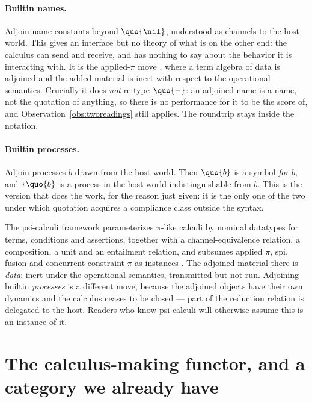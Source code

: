 \paragraph{Builtin names.}
Adjoin name constants beyond $\quo{\nil}$, understood as channels
to the host world.
This gives an interface but no theory of what is on the other end:
the calculus can send and receive, and has nothing to say about the
behavior it is interacting with.
It is the applied-$\pi$ move \cite{abadi2001}, where a term algebra
of data is adjoined and the added material is inert with respect to
the operational semantics.
Crucially it does \emph{not} re-type $\quo{-}$: an adjoined name is
a name, not the quotation of anything, so there is no performance
for it to be the score of, and Observation~\ref{obs:tworeadings}
still applies.
The roundtrip stays inside the notation.

\paragraph{Builtin processes.}
Adjoin processes $b$ drawn from the host world.
Then $\quo{b}$ is a symbol \emph{for} $b$, and $*\quo{b}$ is a
process in the host world indistinguishable from $b$.
This is the version that does the work, for the reason just given:
it is the only one of the two under which quotation acquires a
compliance class outside the syntax.

\begin{remark}
\label{rem:psi}
The psi-calculi framework parameterizes $\pi$-like calculi by
nominal datatypes for terms, conditions and assertions, together
with a channel-equivalence relation, a composition, a unit and an
entailment relation, and subsumes applied $\pi$, spi, fusion and
concurrent constraint $\pi$ as instances \cite{bengtson2011}.
The adjoined material there is \emph{data}: inert under the
operational semantics, transmitted but not run.
Adjoining builtin \emph{processes} is a different move, because the
adjoined objects have their own dynamics and the calculus ceases to
be closed --- part of the reduction relation is delegated to the
host.
Readers who know psi-calculi will otherwise assume this is an
instance of it.
\end{remark}

\section{The calculus-making functor, and a category we already have}
\label{sec:functor}


